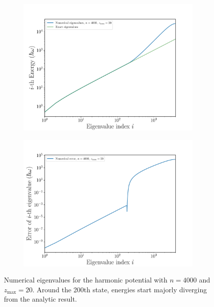 \documentclass[a4paper,DIV=12,english]{scrartcl}
\begin{document}
\begin{figure}
    \centering
    \begin{subfigure}{0.49\textwidth}
        \centering
        \includegraphics[width=\textwidth]{../plots/evals/evals.pdf}
        \caption{}
        \label{subfig:evals}
    \end{subfigure}
    \begin{subfigure}{0.49\textwidth}
        \centering
        \includegraphics[width=\textwidth]{../plots/evals/evals_err.pdf}
        \caption{}
        \label{subfig:evals_err}
    \end{subfigure}
    \caption{Numerical eigenvalues for the harmonic potential with $n=4000$ and $z_\text{max}=20$. Around the 200th state, energies start majorly diverging from the analytic result.}
    \label{fig:evals}
\end{figure}
\end{document}
